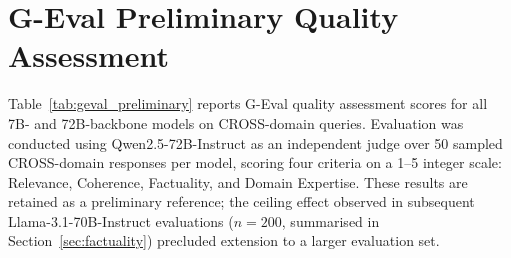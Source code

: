 
\section{G-Eval Preliminary Quality Assessment}
\label{appendix:geval}

Table~\ref{tab:geval_preliminary} reports G-Eval quality assessment scores
for all 7B- and 72B-backbone models on CROSS-domain queries.
Evaluation was conducted using Qwen2.5-72B-Instruct as an independent judge
over 50 sampled CROSS-domain responses per model, scoring four criteria on a
1--5 integer scale: Relevance, Coherence, Factuality, and Domain Expertise.
These results are retained as a preliminary reference; the ceiling effect
observed in subsequent Llama-3.1-70B-Instruct evaluations ($n{=}200$,
summarised in Section~\ref{sec:factuality}) precluded extension to a larger
evaluation set.

